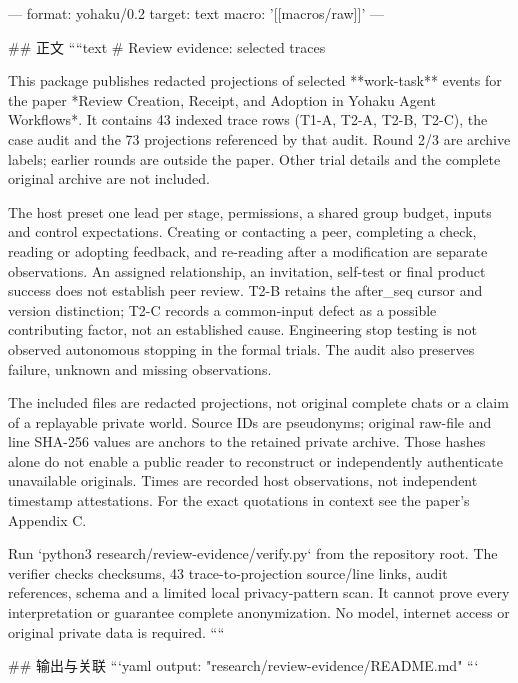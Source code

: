 ---
format: yohaku/0.2
target: text
macro: '[[macros/raw]]'
---

## 正文
````text
# Review evidence: selected traces

This package publishes redacted projections of selected **work-task** events for the paper *Review Creation, Receipt, and Adoption in Yohaku Agent Workflows*. It contains 43 indexed trace rows (T1-A, T2-A, T2-B, T2-C), the case audit and the 73 projections referenced by that audit. Round 2/3 are archive labels; earlier rounds are outside the paper. Other trial details and the complete original archive are not included.

The host preset one lead per stage, permissions, a shared group budget, inputs and control expectations. Creating or contacting a peer, completing a check, reading or adopting feedback, and re-reading after a modification are separate observations. An assigned relationship, an invitation, self-test or final product success does not establish peer review. T2-B retains the after_seq cursor and version distinction; T2-C records a common-input defect as a possible contributing factor, not an established cause. Engineering stop testing is not observed autonomous stopping in the formal trials. The audit also preserves failure, unknown and missing observations.

The included files are redacted projections, not original complete chats or a claim of a replayable private world. Source IDs are pseudonyms; original raw-file and line SHA-256 values are anchors to the retained private archive. Those hashes alone do not enable a public reader to reconstruct or independently authenticate unavailable originals. Times are recorded host observations, not independent timestamp attestations. For the exact quotations in context see the paper's Appendix C.

Run `python3 research/review-evidence/verify.py` from the repository root. The verifier checks checksums, 43 trace-to-projection source/line links, audit references, schema and a limited local privacy-pattern scan. It cannot prove every interpretation or guarantee complete anonymization. No model, internet access or original private data is required.
````

## 输出与关联
```yaml
output: "research/review-evidence/README.md"
```
